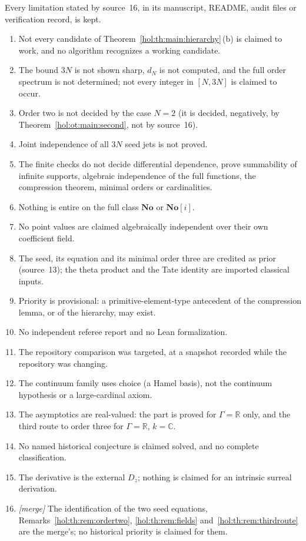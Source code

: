 \documentclass[11pt]{article}
\numberwithin{equation}{section}
\theoremstyle{definition}
\theoremstyle{remark}
\newcommand{\C}{\mathbb C}
\newcommand{\R}{\mathbb R}
\newcommand{\No}{\mathbf{No}}
\begin{document}
Every limitation stated by source~16, in its manuscript, README, audit files or
verification record, is kept.
\begin{enumerate}[label=\textup{(Th\arabic*)}]
\item Not every candidate of Theorem~\ref{hol:th:main:hierarchy}\,(b) is
claimed to work, and no algorithm recognizes a working candidate.
\item The bound $3N$ is not shown sharp, $d_N$ is not computed, and the full
order spectrum is not determined; not every integer in $[N,3N]$ is claimed to
occur.
\item Order two is not decided by the case $N=2$ (it is decided, negatively,
by Theorem~\ref{hol:ot:main:second}, not by source~16).
\item Joint independence of all $3N$ seed jets is not proved.
\item The finite checks do not decide differential dependence, prove
summability of infinite supports, algebraic independence of the full
functions, the compression theorem, minimal orders or cardinalities.
\item Nothing is entire on the full class $\No$ or $\No[i]$.
\item No point values are claimed algebraically independent over their own
coefficient field.
\item The seed, its equation and its minimal order three are credited as prior
(source~13); the theta product and the Tate identity are imported classical
inputs.
\item Priority is provisional: a primitive-element-type antecedent of the
compression lemma, or of the hierarchy, may exist.
\item No independent referee report and no Lean formalization.
\item The repository comparison was targeted, at a snapshot recorded while the
repository was changing.
\item The continuum family uses choice (a Hamel basis), not the continuum
hypothesis or a large-cardinal axiom.
\item The asymptotics are real-valued: the part is proved for $\Gamma=\R$ only,
and the third route to order three for $\Gamma=\R$, $k=\C$.
\item No named historical conjecture is claimed solved, and no complete
classification.
\item The derivative is the external $D_z$; nothing is claimed for an intrinsic
surreal derivation.
\item \emph{[merge]} The identification of the two seed equations,
Remarks~\ref{hol:th:rem:ordertwo}, \ref{hol:th:rem:fields}
and~\ref{hol:th:rem:thirdroute} are the merge's; no historical priority is
claimed for them.
\end{enumerate}
\end{document}
